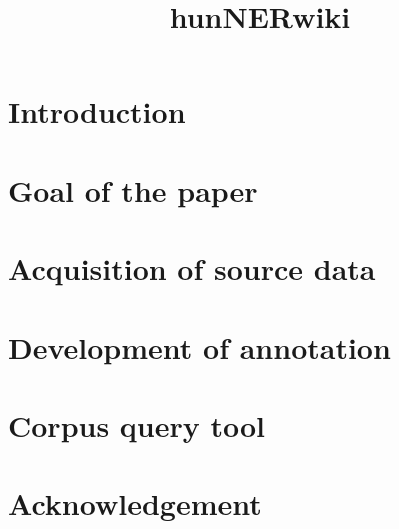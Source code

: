 \documentclass[10pt, a4paper]{article}
\title{hunNERwiki}
\begin{document}
\maketitleabstract

\section{Introduction}


\section{Goal of the paper}



\section{Acquisition of source data}



\section{Development of annotation}







\section{Corpus query tool}














\section{Acknowledgement}



 
\end{document}
